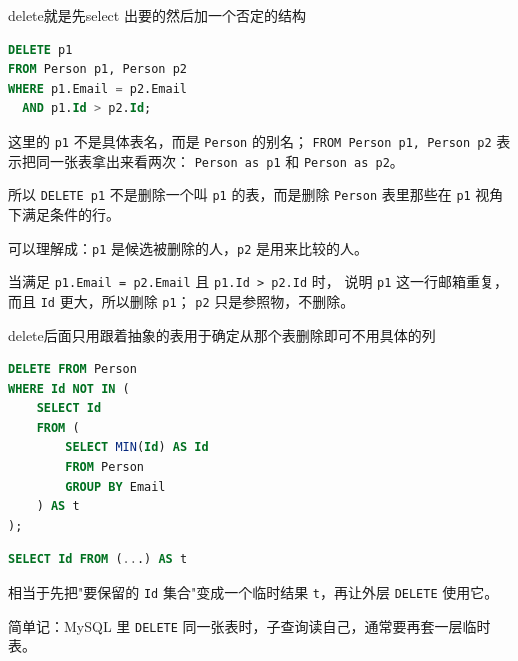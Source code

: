 \begin{homework}[196 | 高级字符串函数 第3题]
\begin{dxtips}
    delete就是先select 出要的然后加一个否定的结构
\end{dxtips}
\begin{note}
\begin{lstlisting}[language=SQL]
DELETE p1
FROM Person p1, Person p2
WHERE p1.Email = p2.Email
  AND p1.Id > p2.Id;
\end{lstlisting}

这里的 \texttt{p1} 不是具体表名，而是 \texttt{Person} 的别名；
\texttt{FROM Person p1, Person p2} 表示把同一张表拿出来看两次：
\texttt{Person as p1} 和 \texttt{Person as p2}。

所以 \texttt{DELETE p1} 不是删除一个叫 \texttt{p1} 的表，而是删除
\texttt{Person} 表里那些在 \texttt{p1} 视角下满足条件的行。

可以理解成：\texttt{p1} 是候选被删除的人，\texttt{p2} 是用来比较的人。

当满足 \texttt{p1.Email = p2.Email} 且 \texttt{p1.Id > p2.Id} 时，
说明 \texttt{p1} 这一行邮箱重复，而且 \texttt{Id} 更大，所以删除 \texttt{p1}；
\texttt{p2} 只是参照物，不删除。
\end{note}
\begin{dxtips}
    delete后面只用跟着抽象的表用于确定从那个表删除即可不用具体的列
\end{dxtips}
\begin{lstlisting}[language=SQL]
DELETE FROM Person
WHERE Id NOT IN (
    SELECT Id
    FROM (
        SELECT MIN(Id) AS Id
        FROM Person
        GROUP BY Email
    ) AS t
);
\end{lstlisting}
\begin{note}
\begin{lstlisting}[language=SQL]
SELECT Id FROM (...) AS t
\end{lstlisting}

相当于先把"要保留的 \texttt{Id} 集合"变成一个临时结果 \texttt{t}，再让外层 \texttt{DELETE} 使用它。

简单记：MySQL 里 \texttt{DELETE} 同一张表时，子查询读自己，通常要再套一层临时表。
\end{note}
\end{homework}

